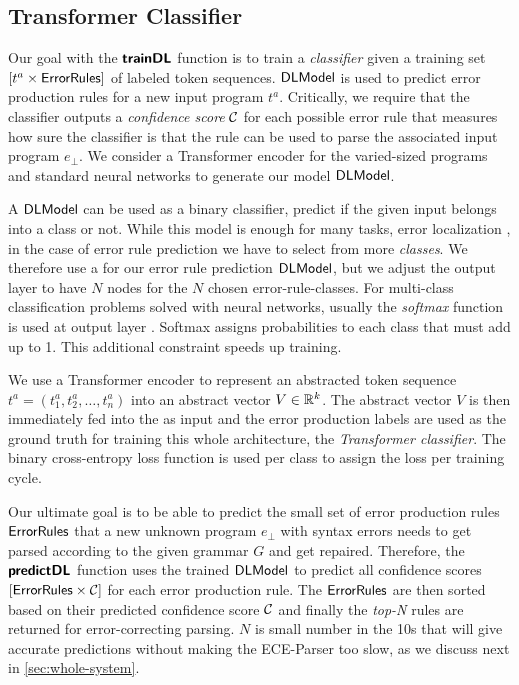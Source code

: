 \subsection{Transformer Classifier}
\label{sec:seq-classifiers:location-rank}

Our goal with the $\bm{\mathsf{trainDL}}$ function is to train a \emph{classifier} given a
training set $[t^a \times \mathsf{ErrorRules}]$ of labeled token sequences.
$\mathsf{DLModel}$ is used to predict error production rules for a new input program
$t^a$. Critically, we require that the classifier outputs a \emph{confidence
score} $\mathcal{C}$ for each possible error rule that measures how sure the
classifier is that the rule can be used to parse the associated input program
$e_{\bot}$. We consider a Transformer encoder for the varied-sized programs and
standard neural networks to generate our model $\mathsf{DLModel}$.

%
A \dnn $\mathsf{DLModel}$ can be used as a binary classifier, \ie predict if the given
input belongs into a class or not. While this model is enough for many tasks,
\eg error localization \citep{Sakkas_2020}, in the case of error rule prediction
we have to select from more \emph{classes}. We therefore use a \dnn for our
error rule prediction $\mathsf{DLModel}$, but we adjust the output layer to have $N$ nodes
for the $N$ chosen error-rule-classes. For multi-class classification problems
solved with neural networks, usually the \emph{softmax} function is used at
output layer \citep{Goodfellow-et-al-2016, Bishop-book-2006}. Softmax assigns
probabilities to each class that must add up to 1. This additional constraint
speeds up training.

%
We use a Transformer encoder to represent an abstracted token sequence $t^a =
(t^a_1, t^a_2, \dots, t^a_n)$ into an abstract vector $V \in \mathbb{R}^k$. The abstract
vector $V$ is then immediately fed into the \dnn as input and the error
production labels are used as the ground truth for training this whole
architecture, \ie the \emph{Transformer classifier}. The binary cross-entropy
loss function is used per class to assign the loss per training cycle.

%
Our ultimate goal is to be able to predict the small set of error production
rules $\mathsf{ErrorRules}$ that a new unknown program $e_\bot$ with syntax errors
needs to get parsed according to the given grammar $G$ and get repaired.
Therefore, the $\bm{\mathsf{predictDL}}$ function uses the trained $\mathsf{DLModel}$ to predict all
confidence scores $[\mathsf{ErrorRules} \times \mathcal{C}]$ for each error production
rule. The $\mathsf{ErrorRules}$ are then sorted based on their predicted confidence
score $\mathcal{C}$ and finally the \emph{top-N} rules are returned for
error-correcting parsing. $N$ is small number in the 10s that will give accurate
predictions without making the ECE-Parser too slow, as we discuss next in
\autoref{sec:whole-system}.

